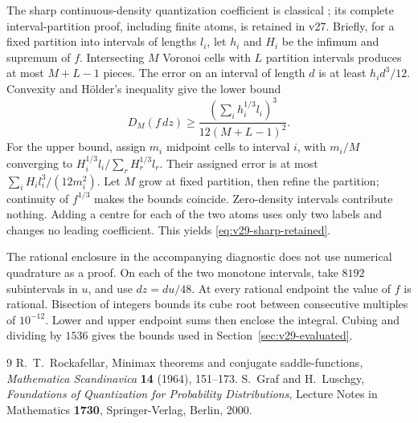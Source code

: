 \documentclass[11pt]{amsart}
\theoremstyle{definition}\newtheorem{definition}[theorem]{Definition}
\theoremstyle{remark}\newtheorem{remark}[theorem]{Remark}
\begin{document}
The sharp continuous-density quantization coefficient is classical \cite{GrafLuschgy2000}; its complete interval-partition proof, including finite atoms, is retained in v27. Briefly, for a fixed partition into intervals of lengths $l_i$, let $h_i$ and $H_i$ be the infimum and supremum of $f$. Intersecting $M$ Voronoi cells with $L$ partition intervals produces at most $M+L-1$ pieces. The error on an interval of length $d$ is at least $h_i d^3/12$. Convexity and H\"older's inequality give the lower bound
\[
 D_M(f\,dz)\ge
       \frac{(\sum_i h_i^{1/3}l_i)^3}{12(M+L-1)^2}.
\]
For the upper bound, assign $m_i$ midpoint cells to interval $i$, with $m_i/M$ converging to $H_i^{1/3}l_i/\sum_r H_r^{1/3}l_r$. Their assigned error is at most $\sum_i H_i l_i^3/(12m_i^2)$. Let $M$ grow at fixed partition, then refine the partition; continuity of $f^{1/3}$ makes the bounds coincide. Zero-density intervals contribute nothing. Adding a centre for each of the two atoms uses only two labels and changes no leading coefficient. This yields \eqref{eq:v29-sharp-retained}.

The rational enclosure in the accompanying diagnostic does not use numerical quadrature as a proof. On each of the two monotone intervals, take $8192$ subintervals in $u$, and use $dz=du/48$. At every rational endpoint the value of $f$ is rational. Bisection of integers bounds its cube root between consecutive multiples of $10^{-12}$. Lower and upper endpoint sums then enclose the integral. Cubing and dividing by $1536$ gives the bounds used in Section~\ref{sec:v29-evaluated}.

\begin{thebibliography}{9}
R.~T.~Rockafellar,
Minimax theorems and conjugate saddle-functions,
\emph{Mathematica Scandinavica} \textbf{14} (1964), 151--173.
S.~Graf and H.~Luschgy,
\emph{Foundations of Quantization for Probability Distributions},
Lecture Notes in Mathematics \textbf{1730}, Springer-Verlag, Berlin, 2000.
\end{thebibliography}
\end{document}
